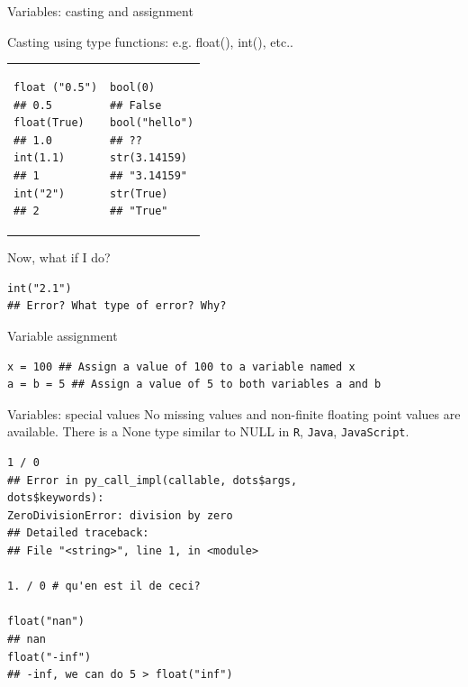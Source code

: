 \documentclass[10pt]{beamer}
\begin{document}
\begin{frame}[fragile]{Variables: casting and assignment}
\begin{block}{Casting using type functions: e.g. float(), int(), etc..}
\vspace*{-0.5cm}
\begin{tabular}{ p{4cm} p{4cm} }
	\centering
	\begin{lstlisting}[style=mypython]
float ("0.5")
## 0.5
float(True)	
## 1.0
int(1.1)
## 1
int("2")
## 2
	\end{lstlisting} & 
	\begin{lstlisting}[style=mypython, numbers=none]
bool(0)
## False
bool("hello")
## ??
str(3.14159) 
## "3.14159"
str(True) 
## "True"
	\end{lstlisting}   
\end{tabular}

\vspace*{-0.7cm}
Now, what if I do? 
\begin{lstlisting}[style=mypython]
int("2.1")
## Error? What type of error? Why? 
\end{lstlisting}
\vspace*{-0.15cm}
Variable assignment
\begin{lstlisting}[style=mypython]
x = 100 ## Assign a value of 100 to a variable named x
a = b = 5 ## Assign a value of 5 to both variables a and b
\end{lstlisting}
\end{block}
\end{frame}


\begin{frame}[fragile]{Variables: special values }
No missing values and non-finite floating point values are available. There is a None type similar to  NULL in \texttt{R}, \texttt{Java}, \texttt{JavaScript}.
\begin{lstlisting}[style=mypython]
1 / 0
## Error in py_call_impl(callable, dots$args, 
dots$keywords):
ZeroDivisionError: division by zero
## Detailed traceback:
## File "<string>", line 1, in <module>

1. / 0 # qu'en est il de ceci? 

float("nan")
## nan
float("-inf")
## -inf, we can do 5 > float("inf")
\end{lstlisting}
\end{frame}
\end{document}
